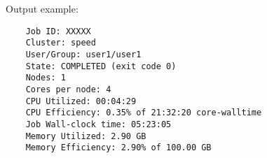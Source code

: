 \begin{itemize}
	Output example:
	\begin{verbatim}
    Job ID: XXXXX
    Cluster: speed
    User/Group: user1/user1
    State: COMPLETED (exit code 0)
    Nodes: 1
    Cores per node: 4
    CPU Utilized: 00:04:29
    CPU Efficiency: 0.35% of 21:32:20 core-walltime
    Job Wall-clock time: 05:23:05
    Memory Utilized: 2.90 GB
    Memory Efficiency: 2.90% of 100.00 GB
	\end{verbatim}
\end{itemize}